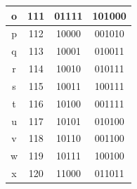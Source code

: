 \documentclass[%
    corpo=11pt,
    twoside,
    stile=classica,
    oldstyle,
    autoretitolo,
    tipotesi=magistrale,
    greek,
    evenboxes,
    english
]{toptesi}
\begin{document}
\begin{table}[]
\begin{tabular}{|c|c|c|c|}
o             & 111                                                           & 01111                                                                        & 101000                                                                       \\ \hline
p             & 112                                                           & 10000                                                                        & 001010                                                                       \\ \hline
q             & 113                                                           & 10001                                                                        & 010011                                                                       \\ \hline
r             & 114                                                           & 10010                                                                        & 010111                                                                       \\ \hline
s             & 115                                                           & 10011                                                                        & 100111                                                                       \\ \hline
t             & 116                                                           & 10100                                                                        & 001111                                                                       \\ \hline
u             & 117                                                           & 10101                                                                        & 010100                                                                       \\ \hline
v             & 118                                                           & 10110                                                                        & 001100                                                                       \\ \hline
w             & 119                                                           & 10111                                                                        & 100100                                                                       \\ \hline
x             & 120                                                           & 11000                                                                        & 011011                                                                       \\ \hline

\end{tabular}
\end{table}
\end{document}
